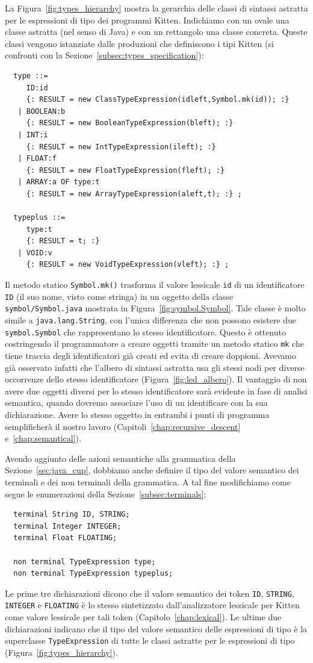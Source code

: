 La Figura~\ref{fig:types_hierarchy} mostra la gerarchia delle classi di
sintassi astratta per le espressioni di tipo dei programmi Kitten.
Indichiamo con un ovale una classe astratta (nel senso di Java) e con
un rettangolo una classe concreta. Queste classi vengono istanziate
dalle produzioni che definiscono i tipi Kitten
(si confronti con la Sezione~\ref{subsec:types_specification}):
%
\begin{verbatim}
  type ::=
     ID:id
     {: RESULT = new ClassTypeExpression(idleft,Symbol.mk(id)); :}
   | BOOLEAN:b
     {: RESULT = new BooleanTypeExpression(bleft); :}
   | INT:i
     {: RESULT = new IntTypeExpression(ileft); :}
   | FLOAT:f
     {: RESULT = new FloatTypeExpression(fleft); :}
   | ARRAY:a OF type:t
     {: RESULT = new ArrayTypeExpression(aleft,t); :} ;

  typeplus ::=
     type:t
     {: RESULT = t; :}
   | VOID:v
     {: RESULT = new VoidTypeExpression(vleft); :} ;
\end{verbatim}
%
Il metodo statico \texttt{Symbol.mk()} trasforma il valore lessicale
\texttt{id} di un identificatore \texttt{ID} (\cioe il suo
nome, visto come stringa) in un oggetto della classe
\texttt{symbol/Symbol.java} mostrata in
Figura~\ref{fig:symbol.Symbol}. Tale classe \`e molto simile a
\texttt{java.lang.String}, con l'unica differenza che non
possono esistere due \texttt{symbol.Symbol} che rappresentano lo
stesso identificatore. Questo \`e ottenuto costringendo il programmatore
a creare oggetti tramite un metodo statico \texttt{mk} che tiene traccia
degli identificatori gi\`a creati ed evita di creare doppioni.
Avevamo gi\`a osservato infatti che l'albero di sintassi astratta
usa gli stessi nodi per diverse occorrenze dello stesso identificatore
(Figura~\ref{fig:led_albero}).
Il vantaggio di non avere due oggetti diversi per lo stesso identificatore
sar\`a evidente in fase di analisi semantica, quando dovremo associare
l'uso di un identificare con la sua dichiarazione. Avere lo stesso oggetto
in entrambi i punti di programma semplificher\`a il nostro lavoro
(Capitoli~\ref{chap:recursive_descent} e~\ref{chap:semantical}).

Avendo aggiunto delle azioni semantiche alla grammatica della
Sezione~\ref{sec:java_cup}, dobbiamo anche definire il tipo del valore
semantico dei terminali e dei non terminali della grammatica.
A tal fine modifichiamo come segue le
enumerazioni della Sezione~\ref{subsec:terminals}:
%
\begin{verbatim}
  terminal String ID, STRING;
  terminal Integer INTEGER;
  terminal Float FLOATING;

  non terminal TypeExpression type;
  non terminal TypeExpression typeplus;
\end{verbatim}
%
Le prime tre dichiarazioni dicono che il valore semantico dei token
\texttt{ID}, \texttt{STRING}, \texttt{INTEGER} e \texttt{FLOATING}
\`e lo stesso sintetizzato dall'analizzatore lessicale per Kitten
come valore lessicale per tali token (Capitolo~\ref{chap:lexical}).
Le ultime due dichiarazioni indicano che
il tipo del valore semantico delle espressioni di tipo \`e
la superclasse \texttt{TypeExpression} di tutte le classi astratte per
le espressioni di tipo (Figura~\ref{fig:types_hierarchy}).
%
